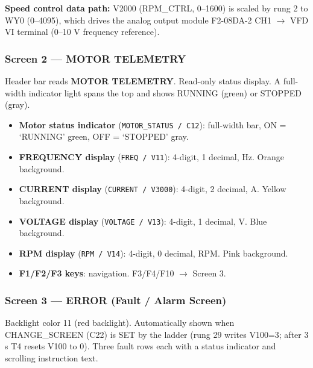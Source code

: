 \documentclass[hidelinks,12pt]{article}
\begin{document}
\textbf{Speed control data path:} V2000 (RPM\_CTRL, 0--1600) is scaled by rung 2 to
WY0 (0--4095), which drives the analog output module F2-08DA-2 CH1 $\rightarrow$ VFD VI
terminal (0--10 V frequency reference).

\subsubsection{Screen 2 --- MOTOR TELEMETRY}

Header bar reads \textbf{MOTOR TELEMETRY}. Read-only status display. A
full-width indicator light spans the top and shows RUNNING (green) or STOPPED
(gray).

\begin{itemize}
    \item \textbf{Motor status indicator} (\texttt{MOTOR\_STATUS / C12}): full-width bar, ON = `RUNNING' green, OFF = `STOPPED' gray.
    \item \textbf{FREQUENCY display} (\texttt{FREQ / V11}): 4-digit, 1 decimal, Hz. Orange background.
    \item \textbf{CURRENT display} (\texttt{CURRENT / V3000}): 4-digit, 2 decimal, A. Yellow background.
    \item \textbf{VOLTAGE display} (\texttt{VOLTAGE / V13}): 4-digit, 1 decimal, V. Blue background.
    \item \textbf{RPM display} (\texttt{RPM / V14}): 4-digit, 0 decimal, RPM. Pink background.
    \item \textbf{F1/F2/F3 keys}: navigation. F3/F4/F10 $\rightarrow$ Screen 3.
\end{itemize}

\subsubsection{Screen 3 --- ERROR (Fault / Alarm Screen)}

Backlight color 11 (red backlight). Automatically shown when CHANGE\_SCREEN
(C22) is SET by the ladder (rung 29 writes V100=3; after 3 s T4 resets V100 to
0). Three fault rows each with a status indicator and scrolling instruction
text.
\end{document}
